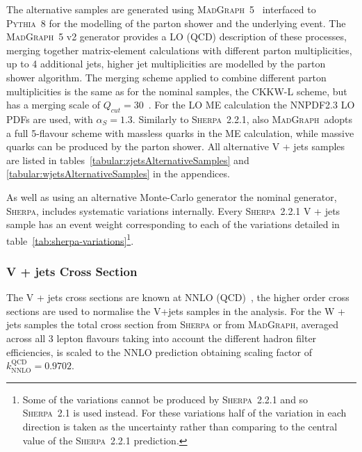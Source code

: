 The alternative samples are generated using
\textsc{MadGraph}~5~\cite{MADGRAPH5_aMC@NLO} interfaced to \textsc{Pythia}~8 for
the modelling of the parton shower and the underlying event. The
\textsc{MadGraph}~5 v2 generator provides a LO (QCD) description of these
processes, merging together matrix-element calculations with different parton
multiplicities, up to 4 additional jets, higher jet multiplicities are modelled
by the parton shower algorithm. The merging scheme applied to combine different
parton multiplicities is the same as for the nominal samples, the CKKW-L scheme,
but has a merging scale of $Q_{cut} = 30$~\GeV. For the LO ME calculation the
NNPDF2.3 LO PDFs are used, with $\alpha_S = 1.3$.  Similarly to
\textsc{Sherpa}~2.2.1, also \textsc{MadGraph}~adopts a full 5-flavour scheme
with massless quarks in the ME calculation, while massive quarks can be produced
by the parton shower. All alternative V + jets samples are listed in
tables~\ref{tabular:zjetsAlternativeSamples} and
\ref{tabular:wjetsAlternativeSamples} in the appendices.

As well as using an alternative Monte-Carlo generator the nominal generator,
\textsc{Sherpa}, includes systematic variations internally. Every
\textsc{Sherpa}~2.2.1 V + jets sample has an event weight corresponding to each
of the variations detailed in table~\ref{tab:sherpa-variations}\footnote{Some of
the variations cannot be produced by \textsc{Sherpa}~2.2.1 and so
\textsc{Sherpa}~2.1 is used instead. For these variations half of the variation
in each direction is taken as the uncertainty rather than comparing to the
central value of the \textsc{Sherpa}~2.2.1 prediction.}.


\subsubsection{V + jets Cross Section}
The V + jets cross sections are known at NNLO (QCD)~\cite{Butterworth:1287902},
the higher order cross sections are used to normalise the V+jets samples in the
analysis. For the W + jets samples the total cross section from \textsc{Sherpa} or
from \textsc{MadGraph}, averaged across all 3 lepton flavours taking into account the
different hadron filter efficiencies, is scaled to the NNLO prediction obtaining
scaling factor of $k_{\text{NNLO}}^{\text{QCD}} = 0.9702$.

